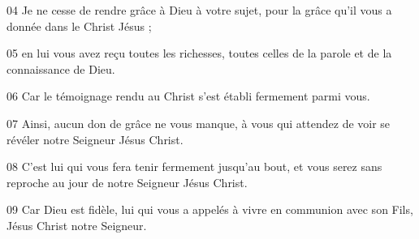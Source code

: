 
04 Je ne cesse de rendre grâce à Dieu à votre sujet, pour la grâce qu’il vous a donnée dans le Christ Jésus ;

05 en lui vous avez reçu toutes les richesses, toutes celles de la parole et de la connaissance de Dieu.

06 Car le témoignage rendu au Christ s’est établi fermement parmi vous.

07 Ainsi, aucun don de grâce ne vous manque, à vous qui attendez de voir se révéler notre Seigneur Jésus Christ.

08 C’est lui qui vous fera tenir fermement jusqu’au bout, et vous serez sans reproche au jour de notre Seigneur Jésus Christ.

09 Car Dieu est fidèle, lui qui vous a appelés à vivre en communion avec son Fils, Jésus Christ notre Seigneur.
